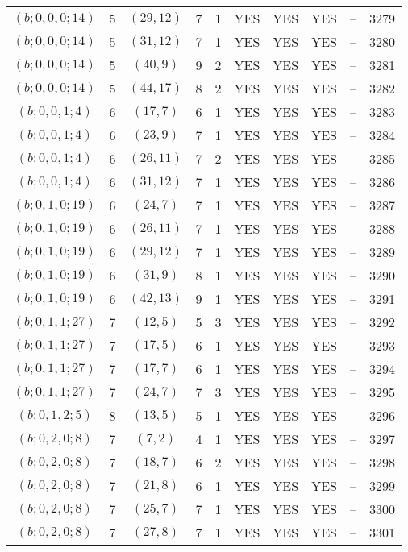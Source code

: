 \begin{longtable}{|c|c|c|c|c|c|c|c|c|c|}
$(b; 0, 0, 0; 14)$ & 5 & $(29, 12)$ & 7 & 1 & YES & YES & YES & -- & 3279\\
$(b; 0, 0, 0; 14)$ & 5 & $(31, 12)$ & 7 & 1 & YES & YES & YES & -- & 3280\\
$(b; 0, 0, 0; 14)$ & 5 & $(40, 9)$ & 9 & 2 & YES & YES & YES & -- & 3281\\
$(b; 0, 0, 0; 14)$ & 5 & $(44, 17)$ & 8 & 2 & YES & YES & YES & -- & 3282\\
$(b; 0, 0, 1; 4)$ & 6 & $(17, 7)$ & 6 & 1 & YES & YES & YES & -- & 3283\\
$(b; 0, 0, 1; 4)$ & 6 & $(23, 9)$ & 7 & 1 & YES & YES & YES & -- & 3284\\
$(b; 0, 0, 1; 4)$ & 6 & $(26, 11)$ & 7 & 2 & YES & YES & YES & -- & 3285\\
$(b; 0, 0, 1; 4)$ & 6 & $(31, 12)$ & 7 & 1 & YES & YES & YES & -- & 3286\\
$(b; 0, 1, 0; 19)$ & 6 & $(24, 7)$ & 7 & 1 & YES & YES & YES & -- & 3287\\
$(b; 0, 1, 0; 19)$ & 6 & $(26, 11)$ & 7 & 1 & YES & YES & YES & -- & 3288\\
$(b; 0, 1, 0; 19)$ & 6 & $(29, 12)$ & 7 & 1 & YES & YES & YES & -- & 3289\\
$(b; 0, 1, 0; 19)$ & 6 & $(31, 9)$ & 8 & 1 & YES & YES & YES & -- & 3290\\
$(b; 0, 1, 0; 19)$ & 6 & $(42, 13)$ & 9 & 1 & YES & YES & YES & -- & 3291\\
$(b; 0, 1, 1; 27)$ & 7 & $(12, 5)$ & 5 & 3 & YES & YES & YES & -- & 3292\\
$(b; 0, 1, 1; 27)$ & 7 & $(17, 5)$ & 6 & 1 & YES & YES & YES & -- & 3293\\
$(b; 0, 1, 1; 27)$ & 7 & $(17, 7)$ & 6 & 1 & YES & YES & YES & -- & 3294\\
$(b; 0, 1, 1; 27)$ & 7 & $(24, 7)$ & 7 & 3 & YES & YES & YES & -- & 3295\\
$(b; 0, 1, 2; 5)$ & 8 & $(13, 5)$ & 5 & 1 & YES & YES & YES & -- & 3296\\
$(b; 0, 2, 0; 8)$ & 7 & $(7, 2)$ & 4 & 1 & YES & YES & YES & -- & 3297\\
$(b; 0, 2, 0; 8)$ & 7 & $(18, 7)$ & 6 & 2 & YES & YES & YES & -- & 3298\\
$(b; 0, 2, 0; 8)$ & 7 & $(21, 8)$ & 6 & 1 & YES & YES & YES & -- & 3299\\
$(b; 0, 2, 0; 8)$ & 7 & $(25, 7)$ & 7 & 1 & YES & YES & YES & -- & 3300\\
$(b; 0, 2, 0; 8)$ & 7 & $(27, 8)$ & 7 & 1 & YES & YES & YES & -- & 3301\\

\end{longtable}
